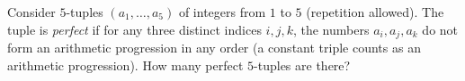 Consider $5$-tuples $(a_1,\dots,a_5)$ of integers from $1$ to $5$ (repetition allowed). The tuple is \emph{perfect} if for any three distinct indices $i,j,k$, the numbers $a_i,a_j,a_k$ do not form an arithmetic progression in any order (a constant triple counts as an arithmetic progression). How many perfect $5$-tuples are there?
